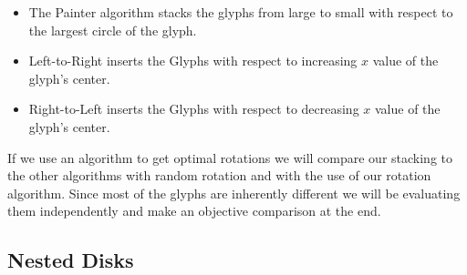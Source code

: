 \documentclass[a4paper,11pt]{article}
\begin{document}
\begin{itemize}
  \item The Painter algorithm stacks the glyphs from large to small with respect to the largest circle of the glyph.
  \item Left-to-Right inserts the Glyphs with respect to increasing $x$ value of the glyph's center.
  \item Right-to-Left inserts the Glyphs with respect to decreasing $x$ value of the glyph's center.
\end{itemize}

If we use an algorithm to get optimal rotations we will compare our stacking to the other algorithms with random rotation and with the use of our rotation algorithm. Since most of the glyphs are inherently different we will be evaluating them independently and make an objective comparison at the end.


\subsection*{Nested Disks}
\end{document}
